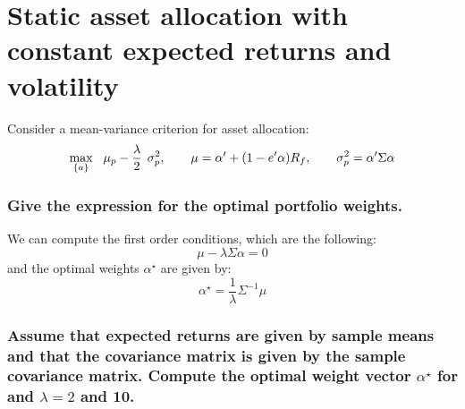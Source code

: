 \chapter{Static asset allocation with constant expected returns and volatility}
Consider a mean-variance criterion for asset allocation:
\begin{equation}
    \underset{\{ a\}}{\textrm{max}} \hspace{0.3cm} \mu_p - \frac{\lambda}{2} \hspace{0.15cm} \sigma_p ^2 , \hspace{0.7cm} \mu = \alpha ' + (1 - e' \alpha)R_f, \hspace{0.7cm} \sigma_p ^2 = \alpha' \Sigma \alpha
\end{equation}

\subsection{Give the expression for the optimal portfolio weights.}
We can compute the first order conditions, which are the following:
$$
\mu - \lambda \Sigma \alpha = 0
$$
and the optimal weights $\alpha^\star$ are given by:
$$
\alpha^\star = \frac{1}{\lambda} \Sigma^{-1} \mu
$$


\subsection{Assume that expected returns are given by sample means and that the covariance
matrix is given by the sample covariance matrix. Compute the optimal weight vector $\alpha^\star$ for and $\lambda = 2$ and 10.}